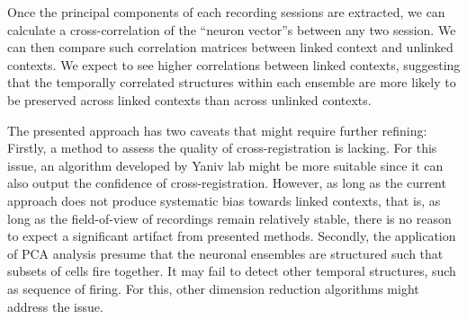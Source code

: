\documentclass[master.tex]{subfiles}
\begin{document}
Once the principal components of each recording sessions are extracted, we can
calculate a cross-correlation of the ``neuron vector''s between any two session.
We can then compare such correlation matrices between linked context and
unlinked contexts. We expect to see higher correlations between linked contexts,
suggesting that the temporally correlated structures within each ensemble are
more likely to be preserved across linked contexts than across unlinked
contexts.

The presented approach has two caveats that might require further refining:
Firstly, a method to assess the quality of cross-registration is lacking. For
this issue, an algorithm developed by Yaniv lab might be more suitable since it
can also output the confidence of cross-registration. However, as long as the
current approach does not produce systematic bias towards linked contexts, that
is, as long as the field-of-view of recordings remain relatively stable, there
is no reason to expect a significant artifact from presented methods. Secondly,
the application of PCA analysis presume that the neuronal ensembles are
structured such that subsets of cells fire together. It may fail to detect other
temporal structures, such as sequence of firing. For this, other dimension
reduction algorithms might address the issue.
\end{document}
